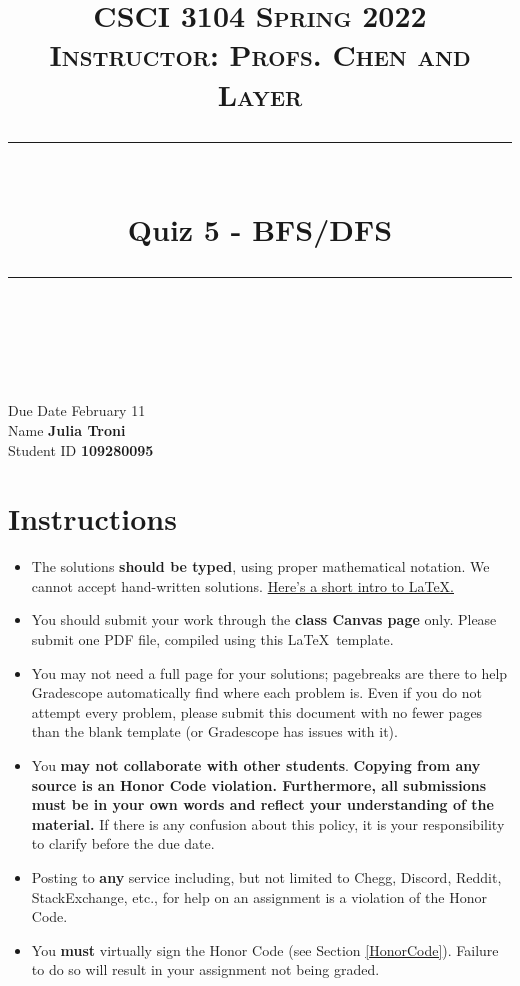 \documentclass[11pt]{article}
\title{
\normalfont \normalsize 
\textsc{CSCI 3104 Spring 2022 \\ 
Instructor: Profs. Chen and Layer} \\
[10pt] 
\rule{\linewidth}{0.5pt} \\[6pt] 
\huge Quiz 5 - BFS/DFS \\
\rule{\linewidth}{2pt}  \\[10pt]
}
\date{}
\theoremstyle{definition}
\theoremstyle{definition}
\theoremstyle{definition}
\begin{document}
\maketitle


\noindent
Due Date \dotfill February 11 \\
Name \dotfill \textbf{Julia Troni} \\
Student ID \dotfill \textbf{109280095} \\

\tableofcontents

\section{Instructions}
 \begin{itemize}
	\item The solutions \textbf{should be typed}, using proper mathematical notation. We cannot accept hand-written solutions. \href{http://ece.uprm.edu/~caceros/latex/introduction.pdf}{Here's a short intro to \LaTeX.}
	\item You should submit your work through the \textbf{class Canvas page} only. Please submit one PDF file, compiled using this \LaTeX \ template.
	\item You may not need a full page for your solutions; pagebreaks are there to help Gradescope automatically find where each problem is. Even if you do not attempt every problem, please submit this document with no fewer pages than the blank template (or Gradescope has issues with it).

	\item You \textbf{may not collaborate with other students}. \textbf{Copying from any source is an Honor Code violation. Furthermore, all submissions must be in your own words and reflect your understanding of the material.} If there is any confusion about this policy, it is your responsibility to clarify before the due date. 

	\item Posting to \textbf{any} service including, but not limited to Chegg, Discord, Reddit, StackExchange, etc., for help on an assignment is a violation of the Honor Code.

	\item You \textbf{must} virtually sign the Honor Code (see Section \ref{HonorCode}). Failure to do so will result in your assignment not being graded.
\end{itemize}
\end{document}

